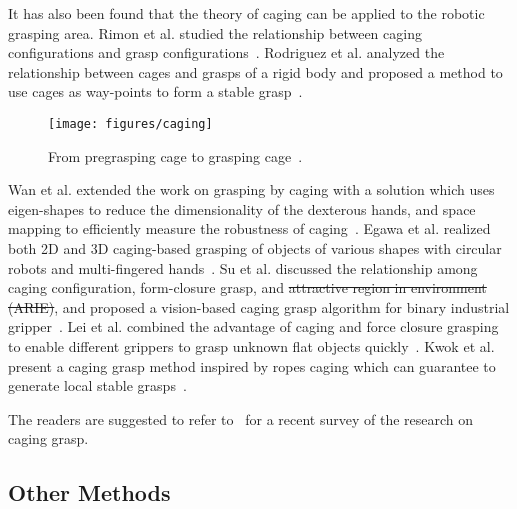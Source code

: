 \documentclass[journal,twoside,web]{ieeecolor}
\providecommand{\DIFadd}[1]{{\protect\color{blue}\uwave{#1}}} %
\providecommand{\DIFdel}[1]{{\protect\color{red}\sout{#1}}}                      %
\providecommand{\DIFaddbegin}{} %
\providecommand{\DIFaddend}{} %
\providecommand{\DIFdelbegin}{} %
\providecommand{\DIFdelend}{} %
\newcommand{\DIFscaledelfig}{0.5}
\newlength{\DIFdelgraphicswidth} %
\newlength{\DIFdelgraphicsheight} %
\newcommand{\DIFaddincludegraphics}[2][]{{\color{blue}\fbox{\DIFOincludegraphics[#1]{#2}}}} %
\newcommand{\DIFdelincludegraphics}[2][]{%
\sbox{\DIFdelgraphicsbox}{\DIFOincludegraphics[#1]{#2}}%
\settoboxwidth{\DIFdelgraphicswidth}{\DIFdelgraphicsbox} %
\settoboxtotalheight{\DIFdelgraphicsheight}{\DIFdelgraphicsbox} %
\scalebox{\DIFscaledelfig}{%
\parbox[b]{\DIFdelgraphicswidth}{\usebox{\DIFdelgraphicsbox}\\[-\baselineskip] \rule{\DIFdelgraphicswidth}{0em}}\llap{\resizebox{\DIFdelgraphicswidth}{\DIFdelgraphicsheight}{%
\setlength{\unitlength}{\DIFdelgraphicswidth}%
\begin{picture}(1,1)%
\thicklines\linethickness{2pt} %
{\color[rgb]{1,0,0}\put(0,0){\framebox(1,1){}}}%
{\color[rgb]{1,0,0}\put(0,0){\line( 1,1){1}}}%
{\color[rgb]{1,0,0}\put(0,1){\line(1,-1){1}}}%
\end{picture}%
}\hspace*{3pt}}} %
} %
\DeclareRobustCommand{\DIFaddbegin}{\DIFOaddbegin \let\includegraphics\DIFaddincludegraphics} %
\DeclareRobustCommand{\DIFaddend}{\DIFOaddend \let\includegraphics\DIFOincludegraphics} %
\DeclareRobustCommand{\DIFdelbegin}{\DIFOdelbegin \let\includegraphics\DIFdelincludegraphics} %
\DeclareRobustCommand{\DIFdelend}{\DIFOaddend \let\includegraphics\DIFOincludegraphics} %
\begin{document}
It has also been found that the theory of caging can be applied to the robotic grasping area. 
Rimon et al. studied the relationship between caging configurations and grasp configurations~\cite{Rimon1999}. 
Rodriguez et al. analyzed the relationship between cages and grasps of a rigid body and proposed a method to use cages as way-points to form a stable grasp~\cite{Rodriguez2012b}. 
\begin{figure}[htbp]
    \centering
    \texttt{[image: figures/caging]}
    \caption{From pregrasping cage to grasping cage~\cite{Rodriguez2012b}.}
    \label{fig:caging}
\end{figure}
Wan et al. extended the work on grasping by caging with a solution which uses eigen-shapes to reduce the dimensionality of the dexterous hands, and space mapping to efficiently measure the robustness of caging~\cite{Wan2013}.
Egawa et al. realized both 2D and 3D caging-based grasping of objects of various shapes with circular robots and multi-fingered hands~\cite{Egawa2015}.
Su et al. discussed the relationship among caging configuration, form-closure grasp, and \DIFdelbegin \DIFdel{attractive region in environment (ARIE)}\DIFdelend \DIFaddbegin \DIFadd{ARIE}\DIFaddend , and proposed a vision-based caging grasp algorithm for \DIFaddbegin \DIFadd{a }\DIFaddend binary industrial gripper~\cite{Su2015a,Su2015b,Su2017}.
Lei et al. combined the advantage of caging and force closure grasping to enable different grippers to grasp unknown flat objects quickly~\cite{Lei2016}.
Kwok et al. present a caging grasp method inspired by ropes caging which can guarantee to generate local stable grasps~\cite{Kwok2016}.

The readers are suggested to refer to~\cite{Makita2017} for a recent survey of the research on caging grasp.

\subsection{Other Methods}
\label{subsec:extrinsic}
\end{document}
